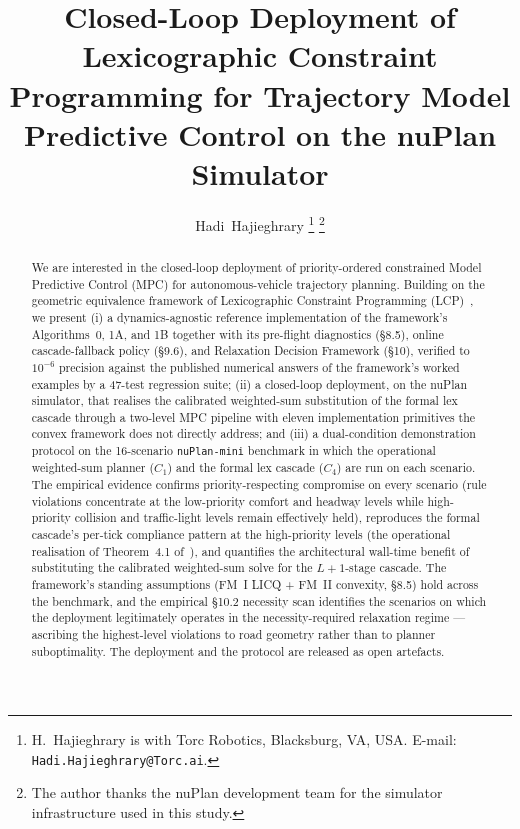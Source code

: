 \documentclass[journal, twocolumn]{IEEEtran}
\begin{document}
\title{Closed-Loop Deployment of Lexicographic Constraint Programming for Trajectory Model Predictive Control on the nuPlan Simulator}

\author{Hadi~Hajieghrary%
\thanks{H.~Hajieghrary is with Torc Robotics, Blacksburg, VA, USA.
        E-mail: \texttt{Hadi.Hajieghrary@Torc.ai}.}%
\thanks{The author thanks the nuPlan development team for the simulator infrastructure used in this study.}%
}

\maketitle

\begin{abstract}
We are interested in the closed-loop deployment of priority-ordered constrained Model Predictive Control (MPC) for autonomous-vehicle trajectory planning. Building on the geometric equivalence framework of Lexicographic Constraint Programming (LCP)~\cite{lcp2025}, we present (i) a dynamics-agnostic reference implementation of the framework's Algorithms~0, 1A, and 1B together with its pre-flight diagnostics (\S8.5), online cascade-fallback policy (\S9.6), and Relaxation Decision Framework (\S10), verified to $10^{-6}$ precision against the published numerical answers of the framework's worked examples by a 47-test regression suite; (ii) a closed-loop deployment, on the nuPlan simulator, that realises the calibrated weighted-sum substitution of the formal lex cascade through a two-level MPC pipeline with eleven implementation primitives the convex framework does not directly address; and (iii) a dual-condition demonstration protocol on the 16-scenario \texttt{nuPlan-mini} benchmark in which the operational weighted-sum planner ($C_1$) and the formal lex cascade ($C_4$) are run on each scenario. The empirical evidence confirms priority-respecting compromise on every scenario (rule violations concentrate at the low-priority comfort and headway levels while high-priority collision and traffic-light levels remain effectively held), reproduces the formal cascade's per-tick compliance pattern at the high-priority levels (the operational realisation of Theorem~4.1 of~\cite{lcp2025}), and quantifies the architectural wall-time benefit of substituting the calibrated weighted-sum solve for the $L{+}1$-stage cascade. The framework's standing assumptions (FM~I LICQ + FM~II convexity, \cite{lcp2025} \S8.5) hold across the benchmark, and the empirical \S10.2 necessity scan identifies the scenarios on which the deployment legitimately operates in the necessity-required relaxation regime --- ascribing the highest-level violations to road geometry rather than to planner suboptimality. The deployment and the protocol are released as open artefacts.
\end{abstract}
\end{document}
